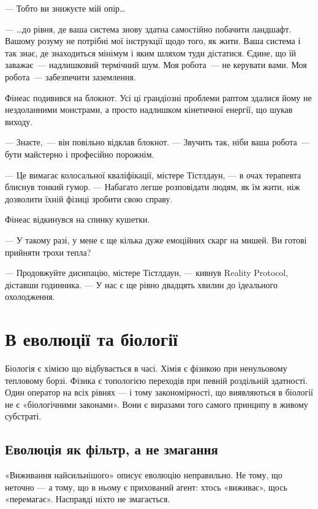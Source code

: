 \documentclass[12pt, a4paper, openany]{book}
\begin{document}
\begin{realitybox}
--- Тобто ви знижуєте мій опір\ldots

--- \ldots до рівня, де ваша система знову здатна самостійно побачити ландшафт. Вашому розуму не потрібні мої інструкції щодо того, як жити. Ваша система і так знає, де знаходиться мінімум і яким шляхом туди дістатися. Єдине, що їй заважає~--- надлишковий термічний шум. Моя робота~--- не керувати вами. Моя робота~--- забезпечити заземлення.

\medskip
Фінеас подивився на блокнот. Усі ці грандіозні проблеми раптом здалися йому не нездоланними монстрами, а просто надлишком кінетичної енергії, що шукав виходу.

--- Знаєте,~--- він повільно відклав блокнот. --- Звучить так, ніби ваша робота~--- бути майстерно і професійно порожнім.

--- Це вимагає колосальної кваліфікації, містере Тістлдаун, --- в очах терапевта блиснув тонкий гумор. --- Набагато легше розповідати людям, як їм жити, ніж дозволити їхній фізиці зробити свою справу.

\medskip
Фінеас відкинувся на спинку кушетки.

--- У такому разі, у мене є ще кілька дуже емоційних скарг на мишей. Ви готові прийняти трохи тепла?

--- Продовжуйте дисипацію, містере Тістлдаун, --- кивнув Reality Protocol, діставши годинника. --- У нас є ще рівно двадцять хвилин до ідеального охолодження.
\end{realitybox}

\chapter{В еволюції та біології}

Біологія є хімією що відбувається в часі. Хімія є фізикою при ненульовому тепловому борзі. Фізика є топологією переходів при певній роздільній здатності. Один оператор на всіх рівнях — і тому закономірності, що виявляються в біології не є «біологічними законами». Вони є виразами того самого принципу в живому субстраті.

\section{Еволюція як фільтр, а не змагання}

«Виживання найсильнішого» описує еволюцію неправильно. Не тому, що неточно — а тому, що в ньому є прихований агент: хтось «виживає», щось «перемагає». Насправді ніхто не змагається.
\end{document}
